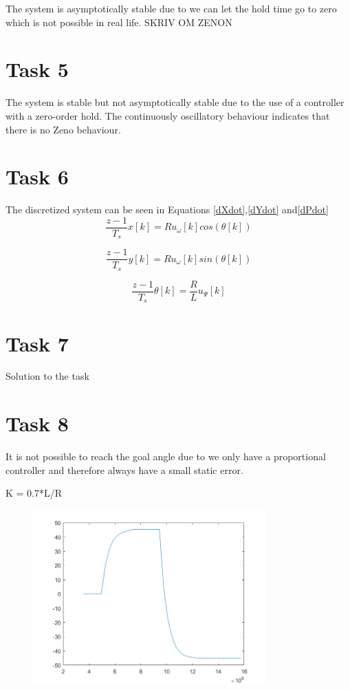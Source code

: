 \documentclass[a4paper,12pt,oneside,onecolumn]{article} %
\begin{document}
The system is asymptotically stable due to we can let the hold time go to zero which is not possible in real life. SKRIV OM ZENON


\section*{Task 5}

The system is stable but not asymptotically stable due to the use of a controller with a zero-order hold. The continuously oscillatory behaviour indicates that there is no Zeno behaviour.
\section*{Task 6}

The discretized system can be seen in Equations \eqref{dXdot},\eqref{dYdot} and\eqref{dPdot}
\begin{equation}
\frac{z-1}{T_s} x[k] = Ru_\omega[k] cos(\theta[k])\label{dXdot}
\end{equation}

\begin{equation}
\frac{z-1}{T_s} y[k] = Ru_\omega[k] sin(\theta[k]) \label{dYdot}
\end{equation}

\begin{equation}
\frac{z-1}{T_s} \theta[k] = \frac{R}{L}u_\Psi[k]\label{dPdot}
\end{equation}


\section*{Task 7}

Solution to the task

\section*{Task 8}

It is not possible to reach the goal angle due to we only have a proportional controller and therefore always have a small static error.

K = 0.7*L/R
\begin{figure}[H]
\begin{center}	
  \includegraphics[width = 0.8\textwidth]{task8.png}
 \end{center}
\end{figure}
\end{document}
